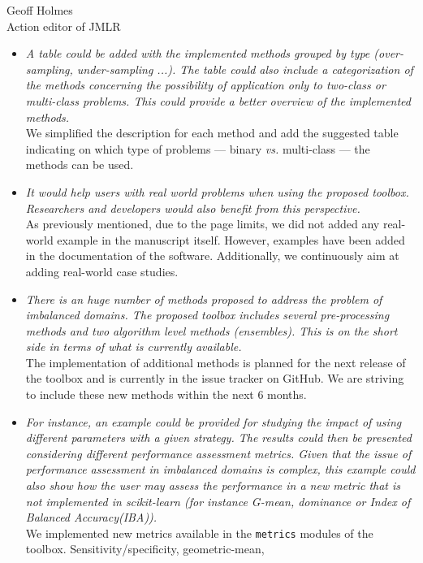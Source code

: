 \documentclass{letter}
\begin{document}
\begin{letter}{Geoff Holmes \\ Action editor of JMLR}
  \begin{itemize}
  \item \textit{A table could be added with the implemented methods
      grouped by type (over-sampling, under-sampling ...). The table
      could also include a categorization of the methods concerning
      the possibility of application only to two-class or multi-class
      problems. This could provide a better overview of the
      implemented methods.}\\
    We simplified the description for each method and add the
    suggested table indicating on which type of problems ---
    binary \emph{vs.} multi-class --- the methods can be used.
  \item \textit{It would help users with real world problems when
      using the proposed toolbox.  Researchers and developers would
      also benefit from this perspective.}\\
    As previously mentioned, due to the page limits, we did not added
    any real-world example in the manuscript itself. However, examples
    have been added in the documentation of the
    software. Additionally, we continuously aim at adding real-world
    case studies.
  \item \textit{There is an huge number of methods proposed to address
      the problem of imbalanced domains.
      The proposed toolbox includes several pre-processing methods and two
      algorithm level methods (ensembles). This is on the short side in
      terms of what is currently available.}\\
    The implementation of additional methods is planned for the next
    release of the toolbox and is currently in the issue tracker on
    GitHub. We are striving to include these new methods within the
    next 6 months.
  \item \textit{For instance, an example could be provided for
      studying the impact of using different parameters with a given
      strategy.
      The results could then be presented considering different performance
      assessment metrics.  Given that the issue of performance assessment in
      imbalanced domains is complex,  this example could also show how the
      user may assess the performance in a new metric that is not
      implemented in scikit-learn (for instance G-mean, dominance or Index
      of Balanced Accuracy(IBA)).}\\
    We implemented new metrics available in the \texttt{metrics}
    modules of the toolbox. Sensitivity/specificity, geometric-mean,

\end{itemize}
\end{letter}
\end{document}
